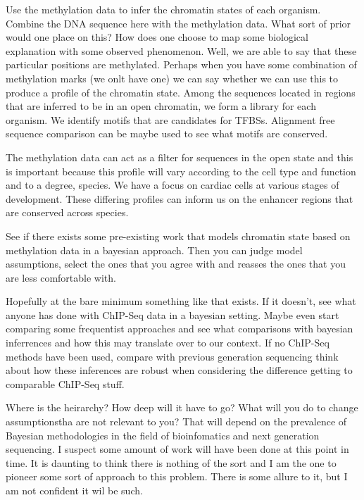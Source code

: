 Use the methylation data to infer the chromatin states of each organism. Combine the DNA sequence here with the methylation data. What sort of prior would one place on this? How does one choose to map some biological explanation with some observed phenomenon. Well, we are able to say that these particular positions are methylated. Perhaps when you have some combination of methylation marks (we onlt have one) we can say whether we can use this to produce a profile of the chromatin state. Among the sequences located in regions that are inferred to be in an open chromatin, we form a library for each organism. We identify motifs that are candidates for TFBSs. Alignment free sequence comparison can be maybe used to see what motifs are conserved. 

The methylation data can act as a filter for sequences in the open state and this is important because this profile will vary according to the cell type and function and to a degree, species. We have a focus on cardiac cells at various stages of development. These differing profiles can inform us on the enhancer regions that are conserved across species. 

See if there exists some pre-existing work that models chromatin state based on methylation data in a bayesian approach. Then you can judge model assumptions, select the ones that you agree with and reasses the ones that you are less comfortable with. 

Hopefully at the bare minimum something like that exists. If it doesn't, see what anyone has done with ChIP-Seq data in a bayesian setting. Maybe even start comparing some frequentist approaches and see what comparisons with bayesian inferrences and how this may translate over to our context. If no ChIP-Seq methods have been used, compare with previous generation sequencing think about how these inferences are robust when considering the difference getting to comparable ChIP-Seq stuff. 

Where is the heirarchy? How deep will it have to go? What will you do to change assumptionstha are not relevant to you? That will depend on the prevalence of Bayesian methodologies in the field of bioinfomatics and next generation sequencing. I suspect some amount of work will have been done at this point in time. It is daunting to think there is nothing of the sort and I am the one to pioneer some sort of approach to this problem. There is some allure to it, but I am not confident it wil be such. 